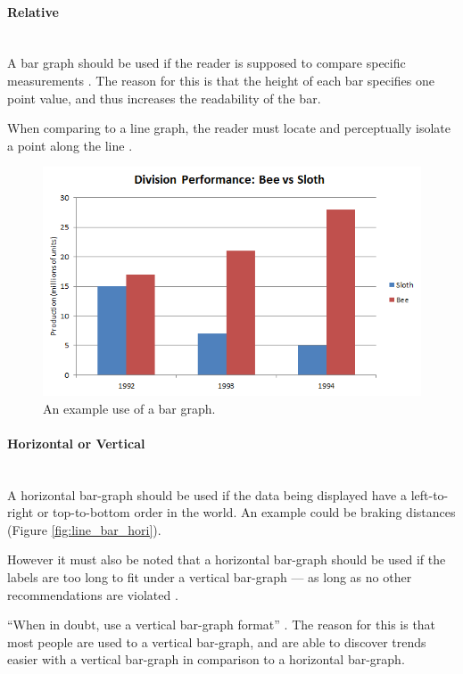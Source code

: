 \paragraph{Relative} ~\\
A bar graph should be used if the reader is supposed to compare specific 
measurements \citep{kosslyn06}. The reason for this is that the height of each 
bar specifies one point value, and thus increases the readability of the bar. 

When comparing to a line graph, the reader must locate and perceptually isolate
a point along the line \citep{kosslyn06}.

\begin{figure}[H]
  \centering
    \includegraphics[scale=1]{chapter3/visualisation/line_bar_relative.png}
  \caption{An example use of a bar graph.}
  \label{fig:line_bar_relative}
\end{figure}


\paragraph{Horizontal or Vertical} ~\\
A horizontal bar-graph should be used if the data being displayed have a 
left-to-right or top-to-bottom order in the world. An example could be braking 
distances (Figure \ref{fig:line_bar_hori}).

However it must also be noted that a horizontal bar-graph should be used if the
labels are too long to fit under a vertical bar-graph --- as long as no other
recommendations are violated \citep{kosslyn06}.

``When in doubt, use a vertical bar-graph format'' \citep{kosslyn06}. The 
reason for this is that most people are used to a vertical bar-graph, and are 
able to discover trends easier with a vertical bar-graph in comparison to a 
horizontal bar-graph.

